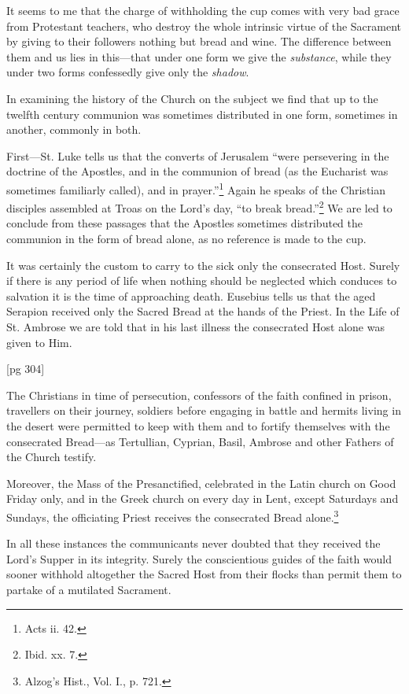 It seems to me that the charge of withholding
the cup comes with very bad grace from Protestant
teachers, who destroy the whole intrinsic virtue
of the Sacrament by giving to their followers
nothing but bread and wine. The difference between
them and us lies in this—that under one
form we give the \emph{substance}, while they under two
forms confessedly give only the \emph{shadow}.

In examining the history of the Church on the
subject we find that up to the twelfth century communion
was sometimes distributed in one form,
sometimes in another, commonly in both.

First—St. Luke tells us that the converts of
Jerusalem “were persevering in the doctrine of
the Apostles, and in the communion of bread (as
the Eucharist was sometimes familiarly called),
and in prayer.”\footnote{Acts ii.
42.} Again he speaks of the Christian
disciples assembled at Troas on the Lord's day,
“to break bread.”\footnote{Ibid. xx.
7.} We are led to conclude from
these passages that the Apostles sometimes distributed
the communion in the form of bread
alone, as no reference is made to the cup.

It was certainly the custom to carry to the sick
only the consecrated Host. Surely if there is any
period of life when nothing should be neglected
which conduces to salvation it is the time of approaching
death. Eusebius tells us that the aged
Serapion received only the Sacred Bread at the
hands of the Priest. In the Life of St. Ambrose
we are told that in his last illness the consecrated
Host alone was given to Him.

[pg 304]

The Christians in time of persecution, confessors
of the faith confined in prison, travellers on
their journey, soldiers before engaging in battle
and hermits living in the desert were permitted to
keep with them and to fortify themselves with the
consecrated Bread—as Tertullian, Cyprian, Basil,
Ambrose and other Fathers of the Church testify.

Moreover, the Mass of the Presanctified, celebrated
in the Latin church on Good Friday only,
and in the Greek church on every day in Lent, except
Saturdays and Sundays, the officiating Priest
receives the consecrated Bread alone.\footnote{Alzog's
Hist., Vol. I., p. 721.}

In all these instances the communicants never
doubted that they received the Lord's Supper in
its integrity. Surely the conscientious guides of
the faith would sooner withhold altogether the
Sacred Host from their flocks than permit them
to partake of a mutilated Sacrament.

